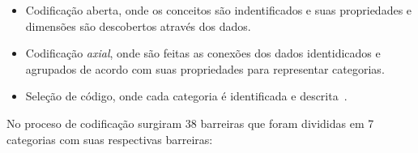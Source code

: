 \begin{itemize}

\item Codificação aberta, onde os conceitos são indentificados e suas propriedades e dimensões
são descobertos através dos dados.

\item Codificação \textit{axial}, onde são feitas as conexões dos dados identidicados e 
agrupados de acordo com suas propriedades para representar categorias.

\item Seleção de código, onde cada categoria é identificada e descrita~\cite{strauss1998basics}.

\end{itemize}

No proceso de codificação surgiram 38 barreiras que foram divididas em 7 categorias com suas 
respectivas barreiras:

